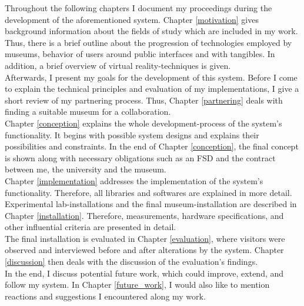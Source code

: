 
Throughout the following chapters I document my proceedings during the development of the aforementioned system. Chapter \ref{motivation} gives background information about the fields of study which are included in my work. Thus, there is a brief outline about the progression of technologies employed by museums, behavior of users around public interfaces and with tangibles. In addition, a brief overview of virtual reality-techniques is given.
\\
Afterwards, I present my goals for the development of this system. Before I come to explain the technical principles and evaluation of my implementations, I give a short review of my partnering process. Thus, Chapter \ref{partnering} deals with finding a suitable museum for a collaboration. 
\\
Chapter \ref{conception} explains the whole development-process of the system's functionality. It begins with possible system designs and explains their possibilities and constraints. In the end of Chapter \ref{conception}, the final concept is shown along with necessary obligations such as an \ac{FSD} and the contract between me, the university and the museum.
\\
Chapter \ref{implementation} addresses the implementation of the system's functionality. Therefore, all libraries and softwares are explained in more detail.
\\
Experimental lab-installations and the final museum-installation are described in Chapter \ref{installation}. Therefore, measurements, hardware specifications, and other influential criteria are presented in detail.
\\
The final installation is evaluated in Chapter \ref{evaluation}, where visitors were observed and interviewed before and after alterations by the system. Chapter \ref{discussion} then deals with the discussion of the evaluation's findings.
\\
In the end, I discuss potential future work, which could improve, extend, and follow my system. In Chapter \ref{future_work}, I would also like to mention reactions and suggestions I encountered along my work.

